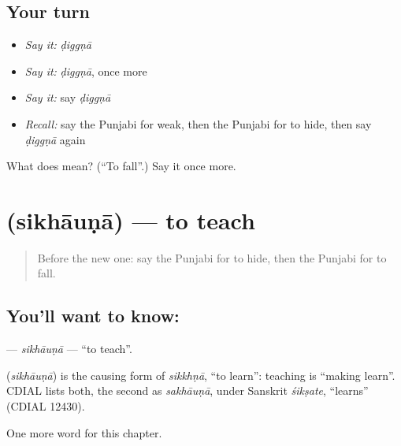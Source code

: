 \subsection*{Your turn}
\begin{itemize}
\raggedright
  \item \emph{Say it:} \emph{ḍiggṇā}
  \item \emph{Say it:} \emph{ḍiggṇā}, once more
  \item \emph{Say it:} say \emph{ḍiggṇā}
  \item \emph{Recall:} say the Punjabi for weak, then the Punjabi for to hide, then say \emph{ḍiggṇā} again
\end{itemize}

\begin{tcolorbox}[breakable,colback=teal!4,colframe=teal!35!black,title={Before you move on}]
What does  mean? (\textquotedblleft{}To fall\textquotedblright{}.) Say it once more.
\end{tcolorbox}
\section[\texorpdfstring{\pa{ਸਿਖਾਉਣਾ} (sikhāuṇā)}{ਸਿਖਾਉਣਾ (sikhāuṇā)}]{ (sikhāuṇā) — to teach}

\label{lesson:PA-C148-sikhauna}



\begin{quote}
Before the new one: say the Punjabi for to hide, then the Punjabi for to fall.
\end{quote}

\subsection*{You'll want to know: }
\textbf{} — \emph{sikhāuṇā} — \textquotedblleft{}to teach\textquotedblright{}.

\begin{cousinweb}
\textbf{} (\emph{sikhāuṇā}) is the causing form of \emph{sikkhṇā}, \textquotedblleft{}to learn\textquotedblright{}: teaching is \textquotedblleft{}making learn\textquotedblright{}. CDIAL lists both, the second as \emph{sakhāuṇā}, under Sanskrit \emph{śikṣate}, \textquotedblleft{}learns\textquotedblright{} (CDIAL 12430).
\end{cousinweb}

\begin{grammarlens}[title={What you've built}]
One more word for this chapter.
\end{grammarlens}


